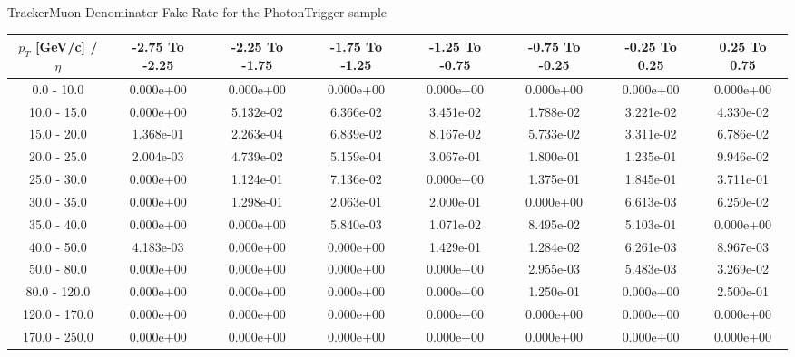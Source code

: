 \large 
TrackerMuon Denominator Fake Rate for the PhotonTrigger sample
\footnotesize 
\begin{tabular*}{\textwidth}{|c|c|c|c|c|c|c|c|}\hline 
$p_T$ [GeV/c] / $\eta$  & -2.75 To -2.25 & -2.25 To -1.75 & -1.75 To -1.25 & -1.25 To -0.75 & -0.75 To -0.25 & -0.25 To 0.25 & 0.25 To 0.75 \\ 
 \hline 
0.0 - 10.0 & 0.000e+00 & 0.000e+00 & 0.000e+00 & 0.000e+00 & 0.000e+00 & 0.000e+00 & 0.000e+00 \\ 
10.0 - 15.0 & 0.000e+00 & 5.132e-02 & 6.366e-02 & 3.451e-02 & 1.788e-02 & 3.221e-02 & 4.330e-02 \\ 
15.0 - 20.0 & 1.368e-01 & 2.263e-04 & 6.839e-02 & 8.167e-02 & 5.733e-02 & 3.311e-02 & 6.786e-02 \\ 
20.0 - 25.0 & 2.004e-03 & 4.739e-02 & 5.159e-04 & 3.067e-01 & 1.800e-01 & 1.235e-01 & 9.946e-02 \\ 
25.0 - 30.0 & 0.000e+00 & 1.124e-01 & 7.136e-02 & 0.000e+00 & 1.375e-01 & 1.845e-01 & 3.711e-01 \\ 
30.0 - 35.0 & 0.000e+00 & 1.298e-01 & 2.063e-01 & 2.000e-01 & 0.000e+00 & 6.613e-03 & 6.250e-02 \\ 
35.0 - 40.0 & 0.000e+00 & 0.000e+00 & 5.840e-03 & 1.071e-02 & 8.495e-02 & 5.103e-01 & 0.000e+00 \\ 
40.0 - 50.0 & 4.183e-03 & 0.000e+00 & 0.000e+00 & 1.429e-01 & 1.284e-02 & 6.261e-03 & 8.967e-03 \\ 
50.0 - 80.0 & 0.000e+00 & 0.000e+00 & 0.000e+00 & 0.000e+00 & 2.955e-03 & 5.483e-03 & 3.269e-02 \\ 
80.0 - 120.0 & 0.000e+00 & 0.000e+00 & 0.000e+00 & 0.000e+00 & 1.250e-01 & 0.000e+00 & 2.500e-01 \\ 
120.0 - 170.0 & 0.000e+00 & 0.000e+00 & 0.000e+00 & 0.000e+00 & 0.000e+00 & 0.000e+00 & 0.000e+00 \\ 
170.0 - 250.0 & 0.000e+00 & 0.000e+00 & 0.000e+00 & 0.000e+00 & 0.000e+00 & 0.000e+00 & 0.000e+00 \\ 
 \hline 
\end{tabular*} 
